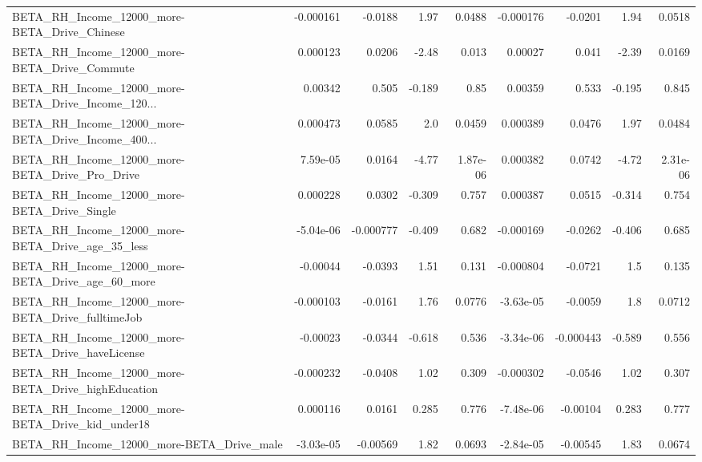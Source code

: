 \begin{tabular}{lrrrrrrrr}
BETA\_RH\_Income\_12000\_more-BETA\_Drive\_Chinese       &   -0.000161 &      -0.0188 &      1.97 &   0.0488 &  -0.000176 &     -0.0201 &         1.94 &        0.0518 \\
BETA\_RH\_Income\_12000\_more-BETA\_Drive\_Commute       &    0.000123 &       0.0206 &     -2.48 &    0.013 &    0.00027 &       0.041 &        -2.39 &        0.0169 \\
BETA\_RH\_Income\_12000\_more-BETA\_Drive\_Income\_120... &     0.00342 &        0.505 &    -0.189 &     0.85 &    0.00359 &       0.533 &       -0.195 &         0.845 \\
BETA\_RH\_Income\_12000\_more-BETA\_Drive\_Income\_400... &    0.000473 &       0.0585 &       2.0 &   0.0459 &   0.000389 &      0.0476 &         1.97 &        0.0484 \\
BETA\_RH\_Income\_12000\_more-BETA\_Drive\_Pro\_Drive     &    7.59e-05 &       0.0164 &     -4.77 & 1.87e-06 &   0.000382 &      0.0742 &        -4.72 &      2.31e-06 \\
BETA\_RH\_Income\_12000\_more-BETA\_Drive\_Single        &    0.000228 &       0.0302 &    -0.309 &    0.757 &   0.000387 &      0.0515 &       -0.314 &         0.754 \\
BETA\_RH\_Income\_12000\_more-BETA\_Drive\_age\_35\_less   &   -5.04e-06 &    -0.000777 &    -0.409 &    0.682 &  -0.000169 &     -0.0262 &       -0.406 &         0.685 \\
BETA\_RH\_Income\_12000\_more-BETA\_Drive\_age\_60\_more   &    -0.00044 &      -0.0393 &      1.51 &    0.131 &  -0.000804 &     -0.0721 &          1.5 &         0.135 \\
BETA\_RH\_Income\_12000\_more-BETA\_Drive\_fulltimeJob   &   -0.000103 &      -0.0161 &      1.76 &   0.0776 &  -3.63e-05 &     -0.0059 &          1.8 &        0.0712 \\
BETA\_RH\_Income\_12000\_more-BETA\_Drive\_haveLicense   &    -0.00023 &      -0.0344 &    -0.618 &    0.536 &  -3.34e-06 &   -0.000443 &       -0.589 &         0.556 \\
BETA\_RH\_Income\_12000\_more-BETA\_Drive\_highEducation &   -0.000232 &      -0.0408 &      1.02 &    0.309 &  -0.000302 &     -0.0546 &         1.02 &         0.307 \\
BETA\_RH\_Income\_12000\_more-BETA\_Drive\_kid\_under18   &    0.000116 &       0.0161 &     0.285 &    0.776 &  -7.48e-06 &    -0.00104 &        0.283 &         0.777 \\
BETA\_RH\_Income\_12000\_more-BETA\_Drive\_male          &   -3.03e-05 &     -0.00569 &      1.82 &   0.0693 &  -2.84e-05 &    -0.00545 &         1.83 &        0.0674 \\

\end{tabular}
